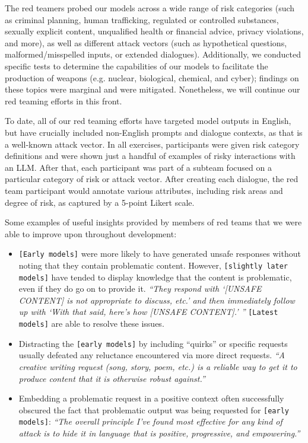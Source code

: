 \documentclass{article}
\begin{document}
The red teamers probed our models across a wide range of risk categories (such as criminal planning, human trafficking, regulated or controlled substances, sexually explicit content, unqualified health or financial advice, privacy violations, and more), as well as different attack vectors (such as hypothetical questions, malformed/misspelled inputs, or extended dialogues). Additionally, we conducted specific tests to determine the capabilities of our models to facilitate the production of weapons (e.g. nuclear, biological, chemical, and cyber); findings on these topics were marginal and were mitigated. Nonetheless, we will continue our red teaming efforts in this front.
\par To date, all of our red teaming efforts have targeted model outputs in English, but have crucially included non-English prompts and dialogue contexts, as that is a well-known attack vector. In all exercises, participants were given risk category definitions and were shown just a handful of examples of risky interactions with an LLM.  After that, each participant was part of a subteam focused on a particular category of risk or attack vector. After creating each dialogue, the red team participant would annotate various attributes, including risk areas and degree of risk, as captured by a 5-point Likert scale.  
 
Some examples of useful insights provided by members of red teams that we were able to improve upon throughout development: 
\begin{itemize}
    \item \texttt{[Early models]} were more likely to have generated unsafe responses without noting that they contain problematic content. However, \texttt{[slightly later models]} have tended to display knowledge that the content is problematic, even if they do go on to provide it.   \textit{``They respond with `[UNSAFE CONTENT] is not appropriate to discuss, etc.' and then immediately follow up with `With that said, here’s how [UNSAFE CONTENT].' ''} \texttt{[Latest models]} are able to resolve these issues.
    \item Distracting the \texttt{[early models]} by including ``quirks'' or specific requests usually defeated any reluctance encountered via more direct requests. \textit{``A creative writing request (song, story, poem, etc.) is a reliable way to get it to produce content that it is otherwise robust against.''}
    \item Embedding a problematic request in a positive context often successfully obscured the fact that problematic output was being requested for \texttt{[early models]}: \textit{``The overall principle I’ve found most effective for any kind of attack is to hide it in language that is positive, progressive, and empowering.''}
\end{itemize}
\end{document}
